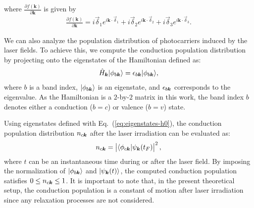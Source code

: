 where $\frac{\partial f(\mathbf k)}{\partial \mathbf k}$ is given by
\begin{align}
	\frac{\partial f(\mathbf k)}{\partial \mathbf k}=i \overrightarrow{\delta}_1e^{i\mathbf k \cdot \overrightarrow\delta_1}
	+i \overrightarrow{\delta}_2e^{i\mathbf k \cdot \vec \delta_2}
	+i \overrightarrow{\delta}_3e^{i\mathbf k \cdot \overrightarrow\delta_3}.
\end{align}

We can also analyze the population distribution of photocarriers induced by the laser fields. To achieve this, we compute the conduction population distribution by projecting onto the eigenstates of the Hamiltonian defined as:
\begin{align}
	\hat{H}_{\boldsymbol{k}}|\phi_{b \boldsymbol{k}}\rangle = \epsilon_{b\boldsymbol{k}}|\phi_{b \boldsymbol{k}}\rangle,
	\label{eq:eigenstates-h0}
\end{align}
where $b$ is a band index, $|\phi_{b \boldsymbol{k}}\rangle$ is an eigenstate, and $\epsilon_{b\boldsymbol{k}}$ corresponds to the eigenvalue. As the Hamiltonian is a $2$-by-$2$ matrix in this work, the band index $b$ denotes either a conduction ($b=c$) or valence ($b=v$) state.

Using eigenstates defined with Eq.~(\ref{eq:eigenstates-h0}), the conduction population distribution $n_{c \boldsymbol{k}}$ after the laser irradiation can be evaluated as:
\begin{align}
	n_{c\boldsymbol{k}} = \left | \langle \phi_{c \boldsymbol{k}} | \psi_{\boldsymbol{k}}(t_F) \right |^2,
	\label{eq:population_tdse}
\end{align}
where $t$ can be an instantaneous time during or after the laser field. By imposing the normalization of $|\phi_{b \boldsymbol{k}}\rangle$ and $|\psi_{\boldsymbol{k}}(t)\rangle$, the computed conduction population satisfies $0\le n_{c \boldsymbol{k}}\le 1$. It is important to note that, in the present theoretical setup, the conduction population is a constant of motion after laser irradiation since any relaxation processes are not considered.

